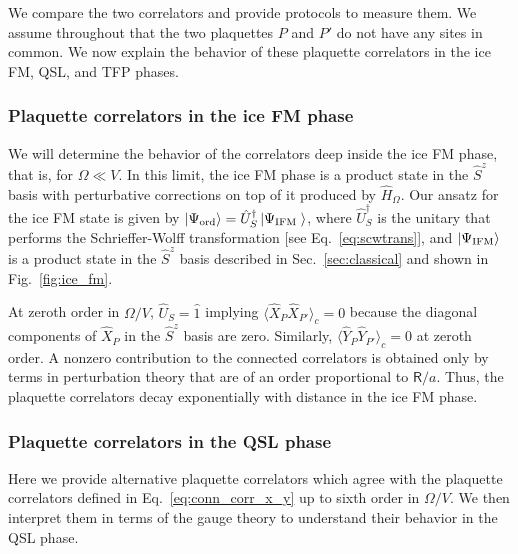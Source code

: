 \documentclass[twocolumn,superscriptaddress,amsmath,amssymb,aps,prx,nofootinbib]{revtex4-2}
\begin{document}
We compare the two correlators and provide protocols to measure them.
We assume throughout that the two plaquettes $P$ and $P'$ do not have any sites in common. 
We now explain the behavior of these plaquette correlators in the ice FM, QSL, and TFP phases.

\subsubsection{Plaquette correlators in the ice FM phase}

We will determine the behavior of the correlators deep inside the ice FM phase, that is, for $\Omega \ll V$. In this limit, the ice FM phase is a product state in the $\hat{S}^z$ basis with perturbative corrections on top of it produced by $\hat{H}_\Omega$. Our ansatz for the ice FM state is given by $\ket{\Psi_{\text{ord}}}=\hat{U}_S^{\dagger}\ket{\Psi_{\text{IFM }}}$, where $\hat{U}_S^\dagger$ is the unitary that performs the Schrieffer-Wolff transformation [see Eq.~\eqref{eq:scwtrans}], and $\ket{\Psi_\text{IFM}}$ is a product state in the $\hat{S}^z$ basis described in Sec.~\ref{sec:classical} and shown in Fig.~\ref{fig:ice_fm}.

At zeroth order in $\Omega/V$, $\hat{U}_S = \hat{1}$ implying $\langle \hat{X}_P \hat{X}_{P'} \rangle_c = 0$ because the diagonal components of $\hat{X}_{P}$ in the $\hat{S}^z$ basis are zero. Similarly, $\langle \hat{Y}_P \hat{Y}_{P'} \rangle_c =0 $ at zeroth order. A nonzero contribution to the connected correlators is obtained only by terms in perturbation theory that are of an order proportional to $\mathsf{R}/a$. Thus, the plaquette correlators decay exponentially with distance in the ice FM phase. 

\subsubsection{Plaquette correlators in the QSL phase}

Here we provide alternative plaquette correlators which agree with the plaquette correlators defined in Eq.~\eqref{eq:conn_corr_x_y} up to sixth order in $\Omega/V$. We then interpret them in terms of the gauge theory to understand their behavior in the QSL phase. 
\end{document}
